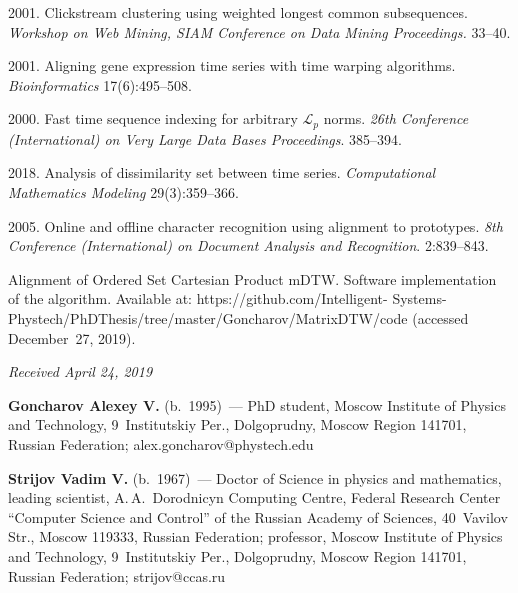 \begin{multicols}{2}
{{\begin{thebibliography}{99}
 2001. 
Clickstream clustering using weighted longest common subsequences.  
\textit{Workshop on Web Mining, SIAM Conference 
on Data Mining Proceedings.} 33--40.

 2001. 
Aligning gene expression time series with time warping algorithms. 
\textit{Bioinformatics} 17(6):495--508.

 2000. 
Fast time sequence indexing for arbitrary $\mathcal{L}_p$ norms. 
\textit{26th  Conference (International) 
on Very Large Data Bases Proceedings}. 385--394.

 2018. 
Analysis of dissimilarity set between time series. 
\textit{Computational Mathematics Modeling } 29(3):359--366.



 2005.
 Online and offline character recognition using alignment to prototypes. 
 \textit{8th  Conference (International) on Document Analysis and Recognition}. 
 2:839--843.

 Alignment of 
Ordered Set Cartesian Product mDTW. Software implementation of the algorithm. 
Available at: {\sf https://github.com/Intelligent-\linebreak 
Systems-Phystech/PhDThesis/tree/master/Goncharov/MatrixDTW/code} 
(accessed December~27, 2019).
\end{thebibliography}

 }
 }

\end{multicols}


\hfill{\small\textit{Received April 24, 2019}}





\Contr

\noindent
\textbf{Goncharov Alexey V.} (b.\ 1995)~--- 
PhD student, Moscow Institute of Physics and Technology, 
9~Institutskiy Per., Dolgoprudny, Moscow Region 141701, 
Russian Federation; \mbox{alex.goncharov@phystech.edu}

\vspace*{3pt}

\noindent
\textbf{Strijov Vadim V.} (b.\ 1967)~--- 
Doctor of Science in physics and mathematics, leading scientist, 
A.\,A.~Dorodnicyn Computing Centre, Federal Research Center 
``Computer Science and Control'' of the Russian Academy of Sciences, 
40~Vavilov Str., Moscow 119333, Russian Federation;
 professor, Moscow Institute of Physics and Technology, 
 9~Institutskiy Per., Dolgoprudny, Moscow Region 141701, Russian Federation; 
 \mbox{strijov@ccas.ru}
\label{end\stat}

\renewcommand{\bibname}{\protect\rm Литература}